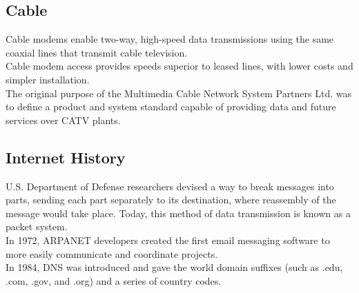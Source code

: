 \subsection{Cable}

Cable modems enable two-way, high-speed data transmissions using the same
coaxial lines that transmit cable television.\\

Cable modem access provides speeds superior to leased lines, with lower costs
and simpler installation.\\

The original purpose of the Multimedia Cable Network System Partners Ltd. was
to define a product and system standard capable of providing data and future
services over CATV plants.

\subsection{Internet History}

U.S. Department of Defense researchers devised a way to break messages into
parts, sending each part separately to its destination, where reassembly of the
message would take place. Today, this method of data transmission is known as a
packet system.\\

In 1972, ARPANET developers created the first email messaging software to more
easily communicate and coordinate projects.\\

In 1984, DNS was introduced and gave the world domain suffixes (such as .edu,
.com, .gov, and .org) and a series of country codes.
